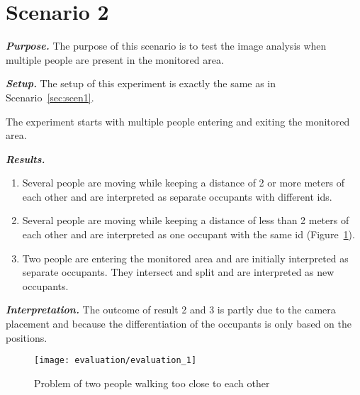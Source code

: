 \section{Scenario 2}
\textit{\textbf{Purpose.}} The purpose of this scenario is to test the image analysis when multiple people are present in the monitored area.

\textit{\textbf{Setup.}} The setup of this experiment is exactly the same as in Scenario~\ref{sec:scen1}.

The experiment starts with multiple people entering and exiting the monitored area.

\textit{\textbf{Results.}}
\begin{enumerate}
\item Several people are moving while keeping a distance of 2 or more meters of each other and are interpreted as separate occupants with different ids.
\item Several people are moving while keeping a distance of less than 2 meters of each other and are interpreted as one occupant with the same id (Figure~\ref{fig:evaluation_1}).
\item Two people are entering the monitored area and are initially interpreted as separate occupants. They intersect and split and are interpreted as new occupants.
\end{enumerate}

\textit{\textbf{Interpretation.}} The outcome of result 2 and 3 is partly due to the camera placement and because the differentiation of the occupants is only based on the positions.

\begin{figure}[htb]
	\centering
	\texttt{[image: evaluation/evaluation\_1]}
	\caption{Problem of two people walking too close to each other}
	\label{fig:evaluation_1}
\end{figure}

